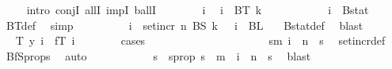 \begin{isabellebody}
\ \ \ \ \isamarkupfalse%
{\isacharparenleft}{\kern0pt}intro\ conjI\ allI\ impI\ ballI{\isacharparenright}{\kern0pt}\isanewline
\ \ \ \ \ \ \isamarkupfalse%
\ i\ \isamarkupfalse%
\ {\isachardoublequoteopen}i\ {\isasymin}\ BT\ {\isacharparenleft}{\kern0pt}k\ {\isacharplus}{\kern0pt}\ {}{\isacharparenright}{\kern0pt}{\isachardoublequoteclose}\isanewline
\ \ \ \ \ \ \isamarkupfalse%
\ \isamarkupfalse%
\ {\isachardoublequoteopen}i\ {\isasymin}\ Bstat{\isachardoublequoteclose}\ \isamarkupfalse%
\ BT{\isacharunderscore}{\kern0pt}def\ \isamarkupfalse%
\ simp\isanewline
\ \ \ \ \ \ \isamarkupfalse%
\ \isamarkupfalse%
\ {\isachardoublequoteopen}i\ {\isasymin}\ set{\isacharunderscore}{\kern0pt}incr\ n\ {\isacharparenleft}{\kern0pt}BS\ k{\isacharparenright}{\kern0pt}{\isachardoublequoteclose}\ {\isacharbar}{\kern0pt}\ \ {\isachardoublequoteopen}i\ {\isasymin}\ BL\ {}{\isachardoublequoteclose}\ \isamarkupfalse%
\ Bstat{\isacharunderscore}{\kern0pt}def\ \isamarkupfalse%
\ blast\isanewline
\ \ \ \ \ \ \isamarkupfalse%
\ \isamarkupfalse%
\ {\isachardoublequoteopen}T\ y\ i\ {\isacharequal}{\kern0pt}\ fT\ i{\isachardoublequoteclose}\isanewline
\ \ \ \ \ \ \isamarkupfalse%
\ {\isacharparenleft}{\kern0pt}cases{\isacharparenright}{\kern0pt}\isanewline
\ \ \ \ \ \ \ \ \isamarkupfalse%
\ {}\isanewline
\ \ \ \ \ \ \ \ \isamarkupfalse%
\ \isamarkupfalse%
\ {\isachardoublequoteopen}{\isasymexists}s{\isacharless}{\kern0pt}m{\isachardot}{\kern0pt}\ i\ {\isacharequal}{\kern0pt}\ n\ {\isacharplus}{\kern0pt}\ s{\isachardoublequoteclose}\ \isamarkupfalse%
\ set{\isacharunderscore}{\kern0pt}incr{\isacharunderscore}{\kern0pt}def\ \isamarkupfalse%
\ BfS{\isacharunderscore}{\kern0pt}props{\isacharparenleft}{\kern0pt}{}{\isacharparenright}{\kern0pt}\ \isamarkupfalse%
\ auto\isanewline
\ \ \ \ \ \ \ \ \isamarkupfalse%
\ \isamarkupfalse%
\ s\ \ s{\isacharunderscore}{\kern0pt}prop{\isacharcolon}{\kern0pt}\ {\isachardoublequoteopen}s\ {\isacharless}{\kern0pt}\ m\ {\isasymand}\ i\ {\isacharequal}{\kern0pt}\ n\ {\isacharplus}{\kern0pt}\ s{\isachardoublequoteclose}\ \isamarkupfalse%
\ blast\isanewline
\ \ \ \ \ \ \ \ \isamarkupfalse%

\end{isabellebody}
